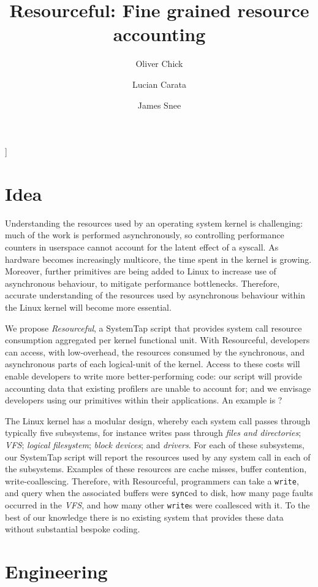 ]\documentclass{article}
\title{Resourceful: Fine grained resource accounting}
\author{Oliver Chick \and Lucian Carata \and James Snee}
\begin{document}
\maketitle{}



\section{Idea}

Understanding the resources used by an operating system kernel is challenging: much of the work is performed asynchronously, so controlling performance counters in userspace cannot account for the latent effect of a syscall.
As hardware becomes increasingly multicore, the time spent in the kernel is growing.
Moreover, further primitives are being added to Linux to increase use of asynchronous behaviour, to mitigate performance bottlenecks.
Therefore, accurate understanding of the resources used by asynchronous behaviour within the Linux kernel will become more essential.

We propose \emph{Resourceful}, a SystemTap script that provides system call resource consumption aggregated per kernel functional unit.
With Resourceful, developers can access, with low-overhead, the resources consumed by the synchronous, and asynchronous parts of each logical-unit of the kernel.
Access to these costs will enable developers to write more better-performing code: our script will provide accounting data that existing profilers are unable to account for; and we envisage developers using our primitives within their applications.
An example is ?

The Linux kernel has  a modular design, whereby each system call passes through typically five subsystems, for instance writes pass through \emph{files and directories}; \emph{VFS}; \emph{logical filesystem}; \emph{block devices}; and \emph{drivers}.
For each of these subsystems, our SystemTap script will report the resources used by any system call in each of the subsystems.
Examples of these resources are cache misses, buffer contention, write-coallescing.
Therefore, with Resourceful, programmers can take a \texttt{write}, and query when the associated buffers were \texttt{sync}ed to disk, how many page faults occurred in the \emph{VFS}, and how many other \texttt{write}s were coallesced with it.
To the best of our knowledge there is no existing system that provides these data without substantial bespoke coding.

\section{Engineering}
\end{document}
